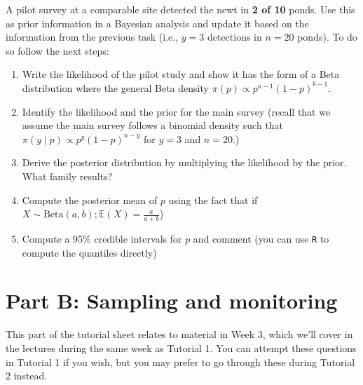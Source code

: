 \documentclass[
  letterpaper,
  DIV=11,
  numbers=noendperiod]{scrartcl}
\providecommand{\tightlist}{%
  \setlength{\itemsep}{0pt}\setlength{\parskip}{0pt}}\usepackage{longtable,booktabs,array}
\begin{document}
\begin{tcolorbox}[enhanced jigsaw, colback=white, title={Level M Extra Question}, bottomrule=.15mm, coltitle=black, toptitle=1mm, opacitybacktitle=0.6, colframe=quarto-callout-important-color-frame, leftrule=.75mm, toprule=.15mm, titlerule=0mm, arc=.35mm, breakable, opacityback=0, rightrule=.15mm, bottomtitle=1mm, colbacktitle=quarto-callout-important-color!10!white, left=2mm]

A pilot survey at a comparable site detected the newt in \textbf{2 of
10} ponds. Use this as prior information in a Bayesian analysis and
update it based on the information from the previous task (i.e.,
\(y = 3\) detections in \(n = 20\) ponds). To do so follow the next
steps:

\begin{enumerate}
\def\labelenumi{\arabic{enumi}.}
\tightlist
\item
  Write the likelihood of the pilot study and show it has the form of a
  Beta distribution where the general Beta density
  \(\pi(p) \propto p^{a-1}(1-p)^{b-1}\).
\item
  Identify the likelihood and the prior for the main survey (recall that
  we assume the main survey follows a binomial density such that
  \(\pi(y \mid p) \propto  p^{y}(1-p)^{n-y}\) for \(y=3\) and \(n=20\).)
\item
  Derive the posterior distribution by multiplying the likelihood by the
  prior. What family results?
\item
  Compute the posterior mean of \(p\) using the fact that if
  \(X\sim\text{Beta}(a,b); \mathbb{E}(X) =\frac{a}{a+b}\))
\item
  Compute a 95\% credible intervals for \(p\) and comment (you can use
  \texttt{R} to compute the quantiles directly)
\end{enumerate}

\end{tcolorbox}

\section{Part B: Sampling and
monitoring}\label{part-b-sampling-and-monitoring}

\begin{tcolorbox}[enhanced jigsaw, colback=white, title=\textcolor{quarto-callout-note-color}{\faInfo}\hspace{0.5em}{Note}, bottomrule=.15mm, coltitle=black, toptitle=1mm, opacitybacktitle=0.6, colframe=quarto-callout-note-color-frame, leftrule=.75mm, toprule=.15mm, titlerule=0mm, arc=.35mm, breakable, opacityback=0, rightrule=.15mm, bottomtitle=1mm, colbacktitle=quarto-callout-note-color!10!white, left=2mm]

This part of the tutorial sheet relates to material in Week 3, which
we'll cover in the lectures during the same week as Tutorial 1. You can
attempt these questions in Tutorial 1 if you wish, but you may prefer to
go through these during Tutorial 2 instead.

\end{tcolorbox}
\end{document}
